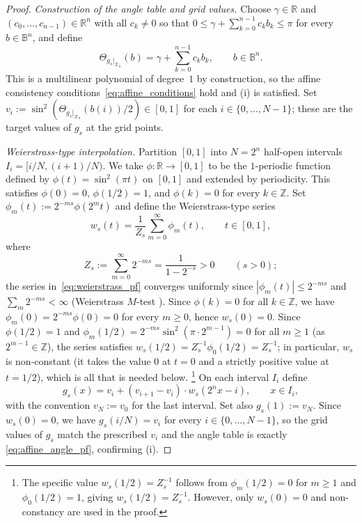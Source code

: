\documentclass[12pt,a4paper]{article}
\theoremstyle{plain}
\theoremstyle{definition}
\theoremstyle{remark}
\newcommand{\R}{\mathbb{R}}
\begin{document}
\begin{proof}
\textit{Construction of the angle table and grid values.}
Choose $\gamma\in\R$ and $(c_0,\ldots,c_{n-1})\in\R^n$ with all
$c_k\neq 0$ so that
$0\leq\gamma+\sum_{k=0}^{n-1}c_k b_k\leq\pi$ for every
$b\in\mathbb{B}^n$, and define
\begin{equation}
  \Theta_{g_s|_{\mathcal{X}_n}}(b) = \gamma+\sum_{k=0}^{n-1}c_k b_k,
  \qquad b\in\mathbb{B}^n.
  \label{eq:affine_angle_pf}
\end{equation}
This is a multilinear polynomial of degree~$1$ by construction, so the
affine consistency conditions~\eqref{eq:affine_conditions} hold and
(i) is satisfied.
Set $v_i := \sin^2(\Theta_{g_s|_{\mathcal{X}_n}}(b(i))/2) \in [0,1]$ for each
$i \in \{0,\ldots,N-1\}$; these are the target values of $g_s$ at the
grid points.

\textit{Weierstrass-type interpolation.}
Partition $[0,1]$ into $N = 2^n$ half-open intervals
$I_i = [i/N, (i+1)/N)$.
We take $\phi:\R\to[0,1]$ to be the $1$-periodic function defined by
$\phi(t) = \sin^2(\pi t)$ on $[0,1]$ and extended by periodicity.
This satisfies $\phi(0)=0$, $\phi(1/2)=1$, and
$\phi(k)=0$ for every $k\in\mathbb{Z}$.
Set $\phi_m(t) := 2^{-ms}\phi(2^m t)$ and define the Weierstrass-type
series
\begin{equation}
  w_s(t) = \frac{1}{Z_s}\sum_{m=0}^{\infty}\phi_m(t),
  \qquad t\in[0,1],
  \label{eq:weierstrass_pf}
\end{equation}
where
\[
  Z_s := \sum_{m=0}^{\infty} 2^{-ms} = \frac{1}{1-2^{-s}} > 0
  \qquad (s > 0);
\]
the series in~\eqref{eq:weierstrass_pf} converges uniformly since
$|\phi_m(t)|\leq 2^{-ms}$ and $\sum_m 2^{-ms}<\infty$
(Weierstrass $M$-test \cite{Zygmund2002}).
Since $\phi(k)=0$ for all $k\in\mathbb{Z}$, we have
$\phi_m(0) = 2^{-ms}\phi(0) = 0$ for every $m\geq 0$,
hence $w_s(0) = 0$.
Since $\phi(1/2)=1$ and $\phi_m(1/2) = 2^{-ms}\sin^2(\pi\cdot 2^{m-1})=0$
for all $m\geq 1$ (as $2^{m-1}\in\mathbb{Z}$), the series satisfies
$w_s(1/2) = Z_s^{-1}\phi_0(1/2)=Z_s^{-1}$; in particular,
$w_s$ is non-constant (it takes the value $0$ at $t=0$ and
a strictly positive value at $t=1/2$), which is all that is needed below.%
\footnote{The specific value $w_s(1/2)=Z_s^{-1}$ follows from
$\phi_m(1/2)=0$ for $m\geq 1$ and $\phi_0(1/2)=1$, giving
$w_s(1/2) = Z_s^{-1}$.
However, only $w_s(0)=0$ and non-constancy are used in the proof.}
On each interval $I_i$ define
\begin{equation}
  g_s(x) = v_i + (v_{i+1}-v_i)\cdot w_s(2^n x - i),
  \qquad x\in I_i,
  \label{eq:gs_def}
\end{equation}
with the convention $v_N := v_0$ for the last interval.
Set also $g_s(1):=v_N$.
Since $w_s(0) = 0$, we have $g_s(i/N) = v_i$ for every
$i \in \{0,\ldots,N-1\}$, so the grid values of $g_s$ match the
prescribed $v_i$ and the angle table is exactly \eqref{eq:affine_angle_pf},
confirming (i).


\end{proof}
\end{document}
